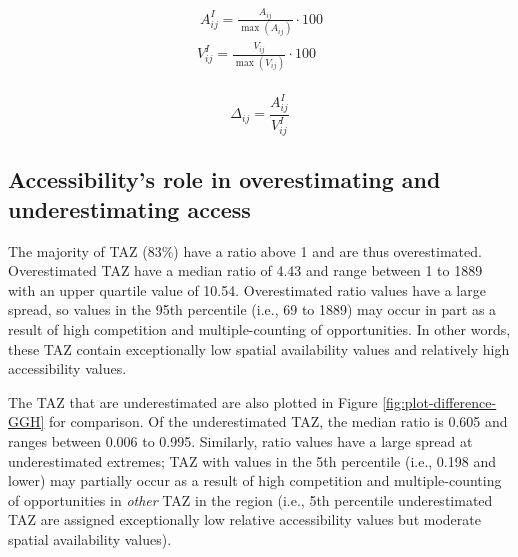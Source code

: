 \documentclass[]{elsarticle} %
\begin{document}
\begin{equation}
\label{eq:index-measures}
\begin{array}{l}\
A^I_{ij} = \frac{A_{ij}}{\max(A_{ij})}\cdot100\\
V^I_{ij} = \frac{V_{ij}}{\max(V_{ij})}\cdot100\\
\end{array}
\end{equation}

\begin{equation}
\label{eq:dif-index-measures}
\Delta_{ij} = \frac{A^I_{ij}}{V^I_{ij}}
\end{equation}

\hypertarget{accessibilitys-role-in-overestimating-and-underestimating-access}{%
\subsection{Accessibility's role in overestimating and underestimating
access}\label{accessibilitys-role-in-overestimating-and-underestimating-access}}

The majority of TAZ (83\%) have a ratio above 1 and are thus
overestimated. Overestimated TAZ have a median ratio of 4.43 and range
between 1 to 1889 with an upper quartile value of 10.54. Overestimated
ratio values have a large spread, so values in the 95th percentile
(i.e., 69 to 1889) may occur in part as a result of high competition and
multiple-counting of opportunities. In other words, these TAZ contain
exceptionally low spatial availability values and relatively high
accessibility values.

The TAZ that are underestimated are also plotted in Figure
\ref{fig:plot-difference-GGH} for comparison. Of the underestimated TAZ,
the median ratio is 0.605 and ranges between 0.006 to 0.995. Similarly,
ratio values have a large spread at underestimated extremes; TAZ with
values in the 5th percentile (i.e., 0.198 and lower) may partially occur
as a result of high competition and multiple-counting of opportunities
in \emph{other} TAZ in the region (i.e., 5th percentile underestimated
TAZ are assigned exceptionally low relative accessibility values but
moderate spatial availability values).
\end{document}
